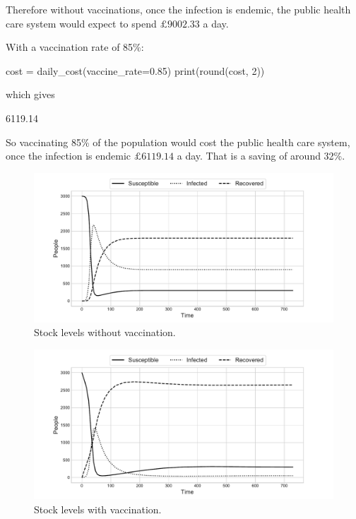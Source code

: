 Therefore without vaccinations, once the infection is endemic, the public health
care system would expect to spend $\pounds 9002.33$ a day.

With a vaccination rate of 85\%:

\begin{pyin}
cost = daily_cost(vaccine_rate=0.85)
print(round(cost, 2))
\end{pyin}

which gives

\begin{pyout}
6119.14
\end{pyout}

So vaccinating 85\% of the population would cost the public health care system,
once the infection is endemic $\pounds 6119.14$ a day. That is a saving of
around 32\%.

\begin{figure}
\begin{center}
\includegraphics[width=\textwidth]{./assets/sd_vaccine_plots/plot_no_vaccine.pdf}
\end{center}
\caption{Stock levels without vaccination.}
\label{fig:plot_no_vaccine}
\end{figure}

\begin{figure}
\begin{center}
\includegraphics[width=\textwidth]{./assets/sd_vaccine_plots/plot_with_vaccine.pdf}
\end{center}
\caption{Stock levels with vaccination.}
\label{fig:plot_with_vaccine}
\end{figure}


